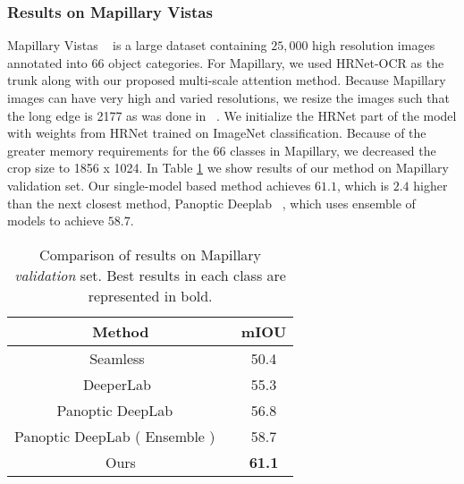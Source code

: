 \documentclass{article}
\begin{document}
\subsubsection{Results on Mapillary Vistas}
Mapillary Vistas ~\cite{MVD2017} is a large dataset containing $25,000$ high resolution images annotated into $66$ object categories. For Mapillary, we used HRNet-OCR as the trunk along with our proposed multi-scale attention method. Because Mapillary images can have very high and varied resolutions, we resize the images such that the long edge is 2177 as was done in ~\cite{cheng2019panopticdeeplab}. We initialize the HRNet part of the model with weights from HRNet trained on ImageNet classification. Because of the greater memory requirements for the 66 classes in Mapillary, we decreased the crop size to 1856 x 1024. In Table \ref{tab:table5} we show results of our method on Mapillary validation set. Our single-model based method achieves $61.1$, which is $2.4$ higher than the next closest method, Panoptic Deeplab ~\cite{cheng2019panopticdeeplab}, which uses ensemble of models to achieve $58.7$. 

\begin{table}[htb!]
\centering
\begin{tabular}{|c       |c|} \hline
               Method  & mIOU \\ \hline\hline
Seamless~\cite{Porzi_2019_CVPR} & 50.4 \\ \hline               
DeeperLab~\cite{yang2019deeperlab} & 55.3 \\ \hline              
Panoptic DeepLab ~\cite{cheng2019panopticdeeplab}             &  56.8   \\ \hline
Panoptic DeepLab ( Ensemble ) ~\cite{cheng2019panopticdeeplab} &  58.7   \\ \hline
Ours                          &  \textbf{61.1}   \\ \hline
\end{tabular}
\vspace{2ex}
\caption{Comparison of results on Mapillary \textit{validation} set. Best results in each class are represented in bold.}
\label{tab:table5}
\end{table}
\end{document}
